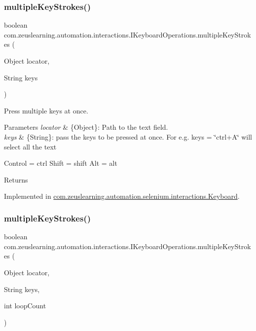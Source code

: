 \subsubsection{\texorpdfstring{multiple\+Key\+Strokes()}{multipleKeyStrokes()}\hspace{0.1cm}{\footnotesize\ttfamily [1/2]}}
{\footnotesize\ttfamily boolean com.\+zeuslearning.\+automation.\+interactions.\+I\+Keyboard\+Operations.\+multiple\+Key\+Strokes (\begin{DoxyParamCaption}\item[{Object}]{locator,  }\item[{String}]{keys }\end{DoxyParamCaption})}

Press multiple keys at once.


\begin{DoxyParams}{Parameters}
{\em locator} & \{Object\}\+: Path to the text field. \\
\hline
{\em keys} & \{String\}\+: pass the keys to be pressed at once. For e.\+g. keys = \char`\"{}ctrl+\+A\char`\"{} will select all the text\\
\hline
\end{DoxyParams}
Control = ctrl Shift = shift Alt = alt \begin{DoxyReturn}{Returns}

\end{DoxyReturn}


Implemented in \hyperlink{classcom_1_1zeuslearning_1_1automation_1_1selenium_1_1interactions_1_1Keyboard_af0c2d93c6dca53eea5fe996df3f85af7}{com.\+zeuslearning.\+automation.\+selenium.\+interactions.\+Keyboard}.

\hypertarget{interfacecom_1_1zeuslearning_1_1automation_1_1interactions_1_1IKeyboardOperations_a8638a90fc1cc0d6f31b7bf8394299d66}{}\label{interfacecom_1_1zeuslearning_1_1automation_1_1interactions_1_1IKeyboardOperations_a8638a90fc1cc0d6f31b7bf8394299d66} 
\subsubsection{\texorpdfstring{multiple\+Key\+Strokes()}{multipleKeyStrokes()}\hspace{0.1cm}{\footnotesize\ttfamily [2/2]}}
{\footnotesize\ttfamily boolean com.\+zeuslearning.\+automation.\+interactions.\+I\+Keyboard\+Operations.\+multiple\+Key\+Strokes (\begin{DoxyParamCaption}\item[{Object}]{locator,  }\item[{String}]{keys,  }\item[{int}]{loop\+Count }\end{DoxyParamCaption})}

